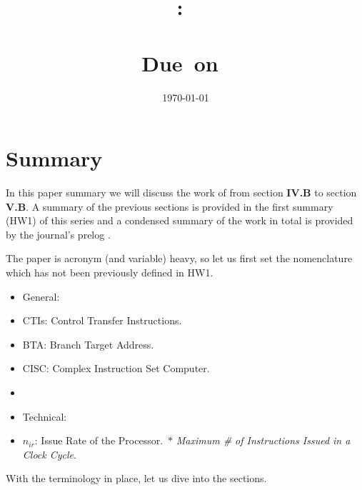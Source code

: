 \documentclass{article}
\title{
    \vspace{2in}
    \textmd{\textbf{\hmwkClass:\ \\ \hmwkTitle}}\\
    \normalsize\vspace{0.1in}\small{Due\ on\ \hmwkDueDate}\\
    \vspace{0.1in}\Large{\textit{\paprTitle}}
    \vspace{3in}
}
\author{\hmwkAuthorName}
\date{\today}
\begin{document}
\maketitle

\pagebreak

\section{Summary}

In this paper summary we will discuss the work of \cite{Sima}
from section \textbf{IV.B} to section \textbf{V.B}.
A summary of the previous sections is provided in the first summary (HW1) of this series and a condensed summary of the work in total is provided by the journal's prelog \cite{Falk}.

The paper is acronym (and variable) heavy, so let us first set the nomenclature which has not been previously defined in HW1.

\begin{itemize}
    \item[] General:
    \item CTIs: Control Transfer Instructions.
    \item BTA: Branch Target Address.
    \item CISC: Complex Instruction Set Computer.
    \item[] \dotfill
    \item[] Technical:
    \item \(n_{ir}\): Issue Rate of the Processor.\
    \subitem \(\ast\) \emph{Maximum \# of Instructions Issued in a Clock Cycle}.
\end{itemize}
With the terminology in place, let us dive into the sections.


\end{document}
